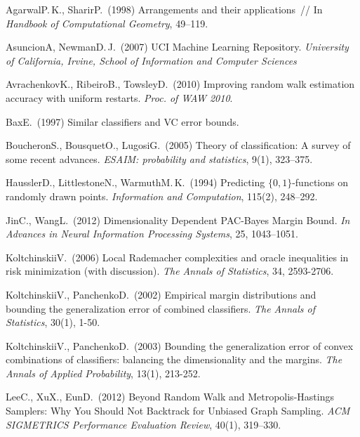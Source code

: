\documentclass{article} %
\begin{document}
\begin{thebibliography}{00}
    Agarwal\;P.\,K., Sharir\;P.~(1998)
    Arrangements and their applications~//
    In \emph{Handbook of Computational Geometry}, 49--119.

    Asuncion\;A, Newman\;D.\,J.~(2007)
    UCI Machine Learning Repository.
    \emph{University of California, Irvine, School of Information and Computer Sciences}

    Avrachenkov\;K., Ribeiro\;B., Towsley\;D.~(2010)
    Improving random walk estimation accuracy with uniform restarts.
    {\it Proc. of WAW 2010}.

    Bax\;E.~(1997)
    Similar classifiers and VC error bounds.

     Boucheron\;S., Bousquet\;O., Lugosi\;G.~(2005)
     Theory of classification: A survey of some recent advances.
     \emph{ESAIM: probability and statistics}, 9(1), 323--375.

     Haussler\;D., Littlestone\;N., Warmuth\;M.\,K.~(1994)
     Predicting $\{0, 1\}$-functions on randomly drawn points.
     \emph{Information and Computation}, 115(2), 248--292.

     Jin\;C., Wang\;L.~(2012)
     Dimensionality Dependent PAC-Bayes Margin Bound.
     \emph{In Advances in Neural Information Processing Systems}, 25, 1043--1051.

     Koltchinskii\;V.~(2006)
     Local Rademacher complexities and oracle inequalities in risk minimization (with discussion).
     \emph{The Annals of Statistics}, 34, 2593-2706.

    Koltchinskii\;V., Panchenko\;D.~(2002)
    Empirical margin distributions and bounding the generalization error of combined classifiers.
    \emph{The Annals of Statistics}, 30(1), 1-50.

    Koltchinskii\;V., Panchenko\;D.~(2003)
    Bounding the generalization error of convex combinations of classifiers: balancing the dimensionality and the margins.
    \emph{The Annals of Applied Probability}, 13(1), 213-252.

    Lee\;C., Xu\;X., Eun\;D.~(2012)
    Beyond Random Walk and Metropolis-Hastings Samplers: Why You Should Not Backtrack for Unbiased Graph Sampling.
    \emph{ACM SIGMETRICS Performance Evaluation Review}, 40(1), 319--330.


\end{thebibliography}
\end{document}
